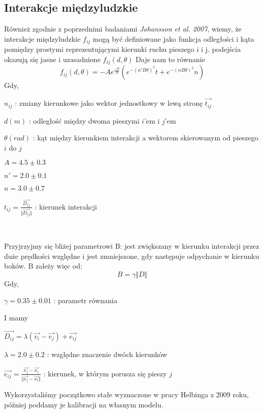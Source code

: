\subsection{Interakcje międzyludzkie}
\hspace{4ex}Również zgodnie z poprzednimi badaniami {\it Johansson et al. 2007}, wiemy, że interakcje międzyludzkie $f_{ij}$ mogą być definiowane jako funkcja odległości i kąta pomiędzy prostymi reprezentującymi kierunki ruchu pieszego i i j. podejścia okazują się jasne i uzasadnione $f_{ij}(d,\theta)$ Daje nam to równanie
\newpage
$$
f_{ij}(d,\theta) = -Ae^{\frac{-d}{B}}(e^{-(n'B\theta)^2}t + e^{-(nB\theta)^2}n)
$$
Gdy,\\
\centerline{$n_{ij}$ : zmiany kierunkowe jako wektor jednostkowy w lewą stronę $\vec{t_{ij}}$}
\centerline{$d(m)$ : odległość między dwoma pieszymi $i$'em i $j$'em}
\centerline{$\theta(rad)$ : kąt między kierunkiem interakcji a wektorem skierowanym od pieszego $i$ do $j$}
\centerline{$A = 4.5 \pm 0.3$}
\centerline{$n' = 2.0 \pm 0.1$}
\centerline{$n = 3.0 \pm 0.7$}
\centerline{$t_{ij} = \frac{\vec{D_{ij}}}{\Vert \vec{D_{ij}} \Vert}$ : kierunek interakcji}\\
\par
Przyjrzyjmy się bliżej parametrowi B: jest zwiększany w kierunku interakcji przez duże prędkości względne i jest zmniejszone, gdy następuje odpychanie w kierunku boków. B zależy więc od:
$$
B = \gamma \Vert D \Vert
$$
Gdy,\\
\centerline{$\gamma = 0.35 \pm 0.01$ : parametr równania}
I mamy \\ \centerline{$\vec{D_{ij}} = \lambda(\vec{v_i} - \vec{v_j}) + \vec{e_{ij}}$}
\centerline{$\lambda = 2.0 \pm 0.2$ : względne znaczenie dwóch kierunków}
\centerline{$\vec{e_{ij}} = \frac{\vec{x_j}-\vec{x_i}}{\Vert \vec{x_j} - \vec{x_i} \Vert}$ : kierunek, w którym porusza się pieszy $j$}


Wykorzystaliśmy początkowo stałe wyznaczone w pracy Helbinga z 2009 roku, później poddamy je kalibracji na własnym modelu.
